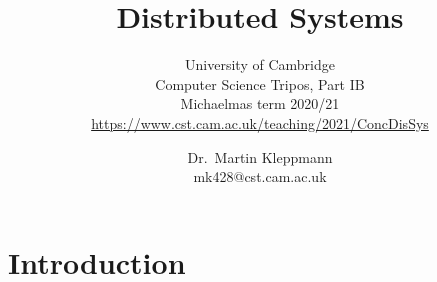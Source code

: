 \newcommand{\coursepath}{/teaching/2021/ConcDisSys}
\newcommand{\courseurl}{\url{https://www.cst.cam.ac.uk\coursepath}}
\newcommand{\thisyear}{2020/21}
\newcommand{\timestampexample}{2020-11-09T09:50:17+00:00}
\newcommand{\whenissecurity}{Part IB Easter term}
\newcommand{\ledgersystems}{https://www.cst.cam.ac.uk/teaching/2021/L47}
\newcommand{\multicore}{https://www.cst.cam.ac.uk/teaching/2021/L304}




\title{Distributed Systems}
\subtitle{University of Cambridge\\Computer Science Tripos, Part IB\\Michaelmas term \thisyear\\\courseurl}

\author{Dr.\ Martin Kleppmann\\mk428@cst.cam.ac.uk}
\date{}
\maketitle

\def\sectionautorefname{Lecture}%
\def\subsectionautorefname{Section}%
\def\subsubsectionautorefname{Section}%


\section{Introduction}\label{sec:introduction}

